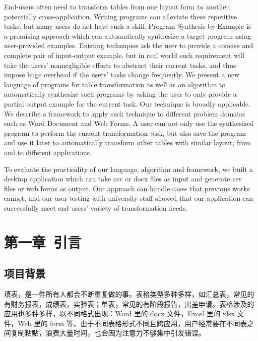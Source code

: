 \documentclass[design, pageheader]{njubachelor}
\begin{document}
\begin{eabstract}
End-users often need to transform tables from one layout form to another, potentially cross-application.
Writing programs can alleviate these repetitive tasks, but many users do not have such a skill.
Program Synthesis by Example is a promising approach which can automatically synthesize a target program using user-provided examples.
Existing techniques ask the user to provide a concise and complete pair of input-output example, but in real world such requirement will take the users' nonnegligible efforts to abstract their current tasks, and thus impose huge overhead if the users' tasks change frequently.
We present a new language of programs for table transformation as well as an algorithm to automatically synthesize such programs by asking the user to only provide a partial output example for the current task.
Our technique is broadly applicable.
We describe a framework to apply such technique to different problem domains such as Word Document and Web Forms.
A user can not only use the synthesized program to perform the current transformation task, but also save the program and use it later to automatically transform other tables with similar layout, from and to different applications. 

To evaluate the practicality of our language, algorithm and framework, we built a desktop application which can take csv or docx files as input and generate csv files or web forms as output.
Our approach can handle cases that previous works cannot, and our user testing with university staff showed that our application can successfully meet end-users' variety of transformation needs.    


\end{eabstract}\nopagebreak


\maketoc
\newpage

\listoffigures
\listoftables
\newpage


\section{第一章~引言}

\subsection{项目背景}
填表，是一件所有人都会不断重复做的事。表格类型多种多样，如汇总表，常见的有财务报表，成绩表，实验表；单表，常见的有阶段报告，出差申请。表格涉及的应用也多种多样，以不同格式出现：Word 里的 docx 文件，Excel 里的 xlsx 文件，Web 里的 form 等。由于不同表格形式不同且跨应用，用户经常要在不同表之间复制粘贴，浪费大量时间，也会因为注意力不够集中引发错误\cite{stolee09}。
\end{document}
